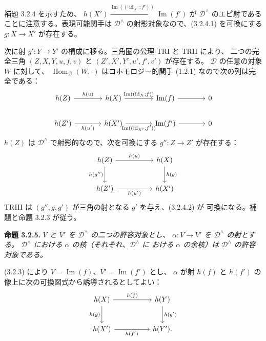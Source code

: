 \clearpage
{}%
\begingroup\small\setlength{\parskip}{0pt}\setlength{\emergencystretch}{1.5em}
補題 3.2.4 を示すため、
$h(X')\xrightarrow{\operatorname{Im}((\operatorname{id}_{X'};f'))}
\operatorname{Im}(f')$ が $\mathcal D^\wedge$ のエピ射であることに注意する。表現可能関手は
$\mathcal D^\wedge$ の射影対象なので、(3.2.4.1) を可換にする
$g\colon X\to X'$ が存在する。

次に射 $g'\colon Y\to Y'$ の構成に移る。三角圏の公理 TRI と TRII により、
二つの完全三角 $(Z,X,Y,u,f,v)$ と $(Z',X',Y',u',f',v')$ が存在する。
$\mathcal D$ の任意の対象 $W$ に対して、
$\operatorname{Hom}_{\mathcal D}(W,\mathord\cdot)$ はコホモロジー的関手 (1.2.1)
なので次の列は完全である：
\[
\begin{tikzcd}[column sep=3.7em]
h(Z)\arrow[r,"h(u)"]&h(X)\arrow[r,"\operatorname{Im}((\operatorname{id}_X;f))"]&\operatorname{Im}(f)\arrow[r]&0\\
h(Z')\arrow[r,"h(u')"']&h(X')\arrow[r,"\operatorname{Im}((\operatorname{id}_{X'};f'))"']&\operatorname{Im}(f')\arrow[r]&0
\end{tikzcd}
\]
$h(Z)$ は $\mathcal D^\wedge$ で射影的なので、次を可換にする
$g''\colon Z\to Z'$ が存在する：
\[
\begin{tikzcd}[column sep=5em,row sep=2.3em]
h(Z)\arrow[r,"h(u)"]\arrow[d,"h(g'')"']&h(X)\arrow[d,"h(g)"]\\
h(Z')\arrow[r,"h(u')"']&h(X')
\end{tikzcd}
\]
TRIII は $(g'',g,g')$ が三角の射となる $g'$ を与え、(3.2.4.2) が
可換になる。補題と命題 3.2.3 が従う。

\medskip\noindent\textbf{命題 3.2.5.}\quad
\textit{$V$ と $V'$ を $\mathcal D^\wedge$ の二つの許容対象とし、
$\alpha\colon V\to V'$ を $\mathcal D^\wedge$ の射とする。
$\mathcal D^\wedge$ における $\alpha$ の核（それぞれ、$\mathcal D^\wedge$ に
おける $\alpha$ の余核）は $\mathcal D^\wedge$ の許容対象である。}

(3.2.3) により $V=\operatorname{Im}(f)$、$V'=\operatorname{Im}(f')$ とし、
$\alpha$ が射 $h(f)$ と $h(f')$ の像上に次の可換図式から誘導されるとしてよい：
\[
\begin{tikzcd}[column sep=5em,row sep=2.4em]
h(X)\arrow[r,"h(f)"]\arrow[d,"h(g)"']&h(Y)\arrow[d,"h(g')"]\\
h(X')\arrow[r,"h(f')"']&h(Y').
\end{tikzcd}
\]
\endgroup
